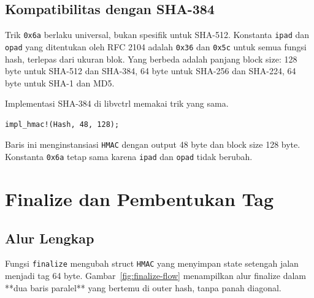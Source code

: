 \documentclass[11pt,a4paper]{article}
\begin{document}
\subsection{Kompatibilitas dengan SHA-384}

Trik \texttt{0x6a} berlaku universal, bukan spesifik untuk SHA-512. Konstanta \texttt{ipad} dan \texttt{opad} yang ditentukan oleh RFC 2104 adalah \texttt{0x36} dan \texttt{0x5c} untuk semua fungsi hash, terlepas dari ukuran blok. Yang berbeda adalah panjang block size: 128 byte untuk SHA-512 dan SHA-384, 64 byte untuk SHA-256 dan SHA-224, 64 byte untuk SHA-1 dan MD5.

Implementasi SHA-384 di libvctrl memakai trik yang sama.

\begin{lstlisting}[style=code]
impl_hmac!(Hash, 48, 128);
\end{lstlisting}

Baris ini menginstansiasi \texttt{HMAC} dengan output 48 byte dan block size 128 byte. Konstanta \texttt{0x6a} tetap sama karena \texttt{ipad} dan \texttt{opad} tidak berubah.

\section{Finalize dan Pembentukan Tag}

\subsection{Alur Lengkap}

Fungsi \texttt{finalize} mengubah struct \texttt{HMAC} yang menyimpan state setengah jalan menjadi tag 64 byte. Gambar~\ref{fig:finalize-flow} menampilkan alur finalize dalam **dua baris paralel** yang bertemu di outer hash, tanpa panah diagonal.
\end{document}
